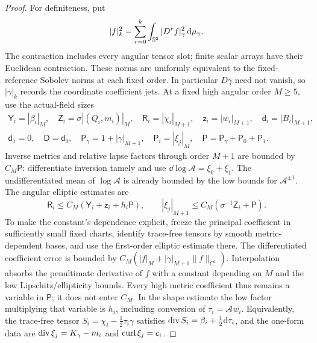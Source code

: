 \begin{proof}
For definiteness, put
\[
 |f|_k^2=\sum_{r=0}^k\int_{\mathbb S^2}|D^r f|_\gamma^2\,\mathrm d\mu_\gamma.
\]
The contraction includes every angular tensor slot; finite scalar
arrays have their Euclidean contraction.  These norms are uniformly
equivalent to the fixed-reference Sobolev norms at each fixed order.
In particular $D\gamma$ need not vanish, so $|\gamma|_k$ records the
coordinate coefficient jets.  At a fixed high angular order $M\ge5$,
use the actual-field sizes
\begin{equation}\label{dn:high-sizes}
\begin{gathered}
 \mathsf Y_i=|\beta_i|_M,\quad
 \mathsf Z_i=\sigma|(Q_i,m_i)|_M,\quad
 \mathsf R_i=|\chi_i|_{M+1},\quad
 \mathsf z_i=|w_i|_{M+1},\quad \mathsf d_i=|B_i|_{M+1},\\
 \mathsf d_1=0,\quad\mathsf D=\mathsf d_0,\quad
 \mathsf P_\gamma=1+|\gamma|_{M+1},\quad
 \mathsf P_i=|\xi_j|_M,\quad
 \mathsf P=\mathsf P_\gamma+\mathsf P_0+\mathsf P_1.
\end{gathered}
\end{equation}
Inverse metrics and relative lapse factors through order $M+1$ are
bounded by $C_M\mathsf P$: differentiate inversion tamely and use
$\dd\log\mathcal A=\xi_0+\xi_1$.  The undifferentiated mean of
$\log\mathcal A$ is already bounded by the low bounds for
$\mathcal A^{\pm1}$.
The angular elliptic estimates are
\begin{equation}\label{dn:high-hodge}
 \mathsf R_i\le C_M(\mathsf Y_i+\mathsf z_i+h_i\mathsf P),
 \qquad
 |\xi_j|_{M+1}\le C_M(\sigma^{-1}\mathsf Z_i+\mathsf P).
\end{equation}
To make the constant's dependence explicit, freeze the principal
coefficient in sufficiently small fixed charts, identify trace-free
tensors by smooth metric-dependent bases, and use the first-order
elliptic estimate there.  The differentiated coefficient error is
bounded by
$C_M(|f|_M+|\gamma|_{M+1}\|f\|_{C^1})$.
Interpolation absorbs the penultimate derivative of $f$ with a
constant depending on $M$ and the low Lipschitz/ellipticity bounds.
Every high metric coefficient thus remains a variable in
$\mathsf P$; it does not enter $C_M$.  In the shape estimate the
low factor multiplying that variable is $h_i$, including conversion
of $\tau_i=\mathcal A w_i$.  Equivalently, the trace-free tensor
$S_i=\chi_i-\tfrac12\tau_i\gamma$ satisfies
$\operatorname{div} S_i=\beta_i+\tfrac12\mathrm d\tau_i$, and the one-form data are
$\operatorname{div}\xi_j=K_\gamma-m_i$ and $\operatorname{curl}\xi_j=c_i$.


\end{proof}
